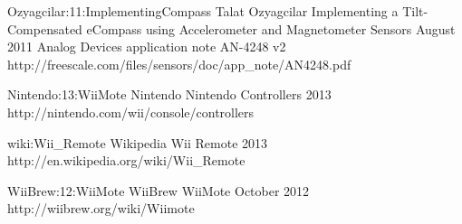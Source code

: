 \newdocref
    {Ozyagcilar:11:ImplementingCompass}
    {Talat Ozyagcilar}
    {Implementing a Tilt-Compensated eCompass using Accelerometer and Magnetometer Sensors}
    {August}
    {2011}
    {Analog Devices application note AN-4248 v2}
    {http://freescale.com/files/sensors/doc/app_note/AN4248.pdf}



\newlinkref
    {Nintendo:13:WiiMote}
    {Nintendo}
    {{Nintendo Controllers}}
    {}
    {2013}
    {}
    {http://nintendo.com/wii/console/controllers}

\newlinkref
    {wiki:Wii_Remote}
    {Wikipedia}
    {{Wii Remote}}
    {}
    {2013}
    {}
    {http://en.wikipedia.org/wiki/Wii_Remote}

\newlinkref
    {WiiBrew:12:WiiMote}
    {WiiBrew}
    {WiiMote}
    {October}
    {2012}
    {}
    {http://wiibrew.org/wiki/Wiimote}
